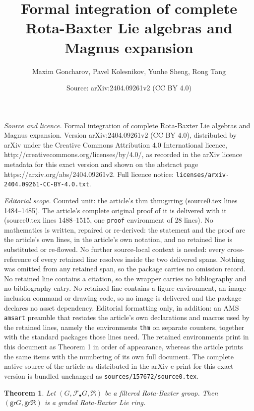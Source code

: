 \documentclass[10pt,a4paper]{amsart}
\title{Formal integration of complete Rota-Baxter Lie algebras and Magnus expansion}
\author{Maxim Goncharov, Pavel Kolesnikov, Yunhe Sheng, Rong Tang}
\date{Source: arXiv:2404.09261v2 (CC BY 4.0)}
\newtheorem{thm}{Theorem}
\newcommand{\frkR}{\mathfrak R}
\newcommand{\gr}{\mathsf{gr}}
\newcommand{\huaF}{\mathcal{F}}
\begin{document}
\maketitle

\noindent\emph{Source and licence.} Formal integration of complete Rota-Baxter Lie algebras and Magnus expansion. Version arXiv:2404.09261v2 (CC BY 4.0), distributed by arXiv under the Creative Commons Attribution 4.0 International licence, http://creativecommons.org/licenses/by/4.0/, as recorded in the arXiv licence metadata for this exact version and shown on the abstract page https://arxiv.org/abs/2404.09261v2. Full licence notice: \texttt{licenses/arxiv-2404.09261-CC-BY-4.0.txt}.\par\smallskip

\noindent\textit{Editorial scope.} Counted unit: the article's thm thm:grring (source0.tex lines 1484--1485). The article's complete original proof of it is delivered with it (source0.tex lines 1488--1515, one \texttt{proof} environment of 28 lines). No mathematics is written, repaired or re-derived: the statement and the proof are the article's own lines, in the article's own notation, and no retained line is substituted or re-flowed.  No further source-local context is needed: every cross-reference of every retained line resolves inside the two delivered spans.  Nothing was omitted from any retained span, so the package carries no omission record.  No retained line contains a citation, so the wrapper carries no bibliography and no bibliography entry.  No retained line contains a figure environment, an image-inclusion command or drawing code, so no image is delivered and the package declares no asset dependency.  Editorial formatting only, in addition: an AMS \texttt{amsart} preamble that restates the article's own declarations and macros used by the retained lines, namely the environments \texttt{thm} on separate counters, together with the standard packages those lines need.  The retained environments print in this document as Theorem 1 in order of appearance, whereas the article prints the same items with the numbering of its own full document.  The complete native source of the article as distributed in the arXiv e-print for this exact version is bundled unchanged as \texttt{sources/157672/source0.tex}.
\begin{thm}\label{thm:grring} Let $(G,\huaF_{\bullet}G,\frkR)$ be a filtered Rota-Baxter group. Then $(\gr G,\gr\frkR)$ is a graded Rota-Baxter Lie ring.
\end{thm}
\end{document}
